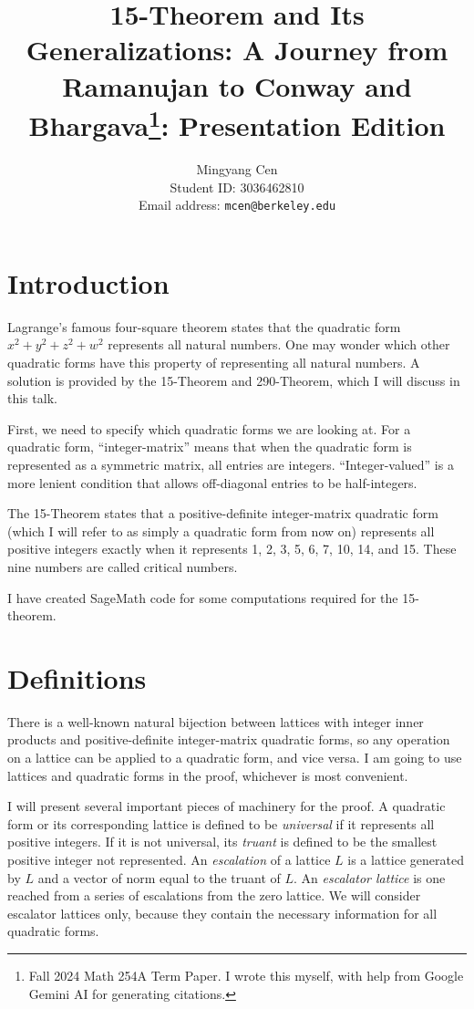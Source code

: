 \documentclass[letterpaper, 12pt]{article}
\title{15-Theorem and Its Generalizations: A Journey from Ramanujan to Conway and Bhargava\footnote{Fall 2024 Math 254A Term Paper. I wrote this myself, with help from Google Gemini AI for generating citations.}: Presentation Edition}
\author{Mingyang Cen \\ Student ID: 3036462810 \\ Email address: \texttt{mcen@berkeley.edu}}
\begin{document}
\maketitle

\section{Introduction}
Lagrange's famous four-square theorem states that the quadratic form $x^2+y^2+z^2+w^2$ represents all natural numbers. One may wonder which other quadratic forms have this property of representing all natural numbers. A solution is provided by the 15-Theorem and 290-Theorem, which I will discuss in this talk.

First, we need to specify which quadratic forms we are looking at. For a quadratic form, ``integer-matrix'' means that when the quadratic form is represented as a symmetric matrix, all entries are integers. ``Integer-valued'' is a more lenient condition that allows off-diagonal entries to be half-integers.

The 15-Theorem states that a positive-definite integer-matrix quadratic form (which I will refer to as simply a quadratic form from now on) represents all positive integers exactly when it represents 1, 2, 3, 5, 6, 7, 10, 14, and 15. These nine numbers are called critical numbers.

I have created SageMath code for some computations required for the 15-theorem.

\section{Definitions}
There is a well-known natural bijection between lattices with integer inner products and positive-definite integer-matrix quadratic forms, so any operation on a lattice can be applied to a quadratic form, and vice versa. I am going to use lattices and quadratic forms in the proof, whichever is most convenient.

I will present several important pieces of machinery for the proof. A quadratic form or its corresponding lattice is defined to be \emph{universal} if it represents all positive integers. If it is not universal, its \emph{truant} is defined to be the smallest positive integer not represented. An \emph{escalation} of a lattice $L$ is a lattice generated by $L$ and a vector of norm equal to the truant of $L$. An \emph{escalator lattice} is one reached from a series of escalations from the zero lattice. We will consider escalator lattices only, because they contain the necessary information for all quadratic forms.
\end{document}
